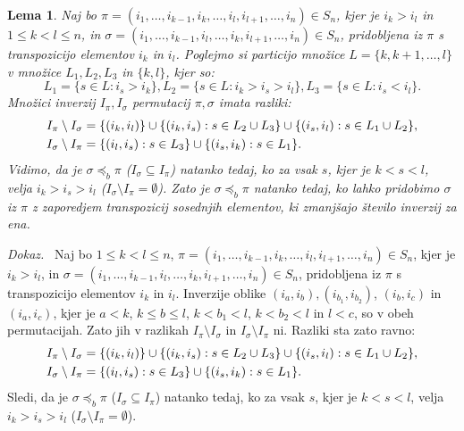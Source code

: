 \documentclass[a4paper, 12pt]{book}
\newtheorem{lema}{Lema}[chapter]
\newenvironment{dokaz}{\emph{Dokaz.}\ }{\hspace{\fill}{$\Box$}}
\begin{document}
\begin{lema}
    Naj bo $\pi = (i_1, \dots, i_{k-1}, i_k, \dots, i_l, i_{l+1}, \dots, i_n) \in S_n$, kjer je $i_k > i_l$ in $1 \leq k < l \leq n$, in $\sigma = (i_1, \dots, i_{k-1}, i_l, \dots, i_k, i_{l+1}, \dots, i_n) \in S_n$, pridobljena iz $\pi$ s transpozicijo elementov $i_k$ in $i_l$. Poglejmo si particijo množice $L = \{ k, k+ 1, \dots, l\}$ v množice $L_1, L_2, L_3$ in $\{ k, l \}$, kjer so:
    \[
        L_1 = \{ s \in L: i_s > i_k \}, L_2 = \{ s \in L: i_k > i_s > i_l \}, L_3 = \{ s \in L: i_s < i_l \}.
    \]
    Množici inverzij $I_{\pi}, I_{\sigma}$ permutacij $\pi, \sigma$ imata razliki:
    \begin{align}
        I_{\pi} \setminus I_{\sigma} &= \{ (i_k, i_l) \} \cup \{ (i_k, i_s): s \in L_2 \cup L_3 \} \cup \{ (i_s, i_l): s \in L_1 \cup L_2 \}, \notag \\
        I_{\sigma} \setminus I_{\pi} &= \{ (i_l, i_s): s \in L_3 \} \cup \{ (i_s, i_k): s \in L_1 \}. \notag
    \end{align}
    Vidimo, da je $\sigma \preceq_b \pi$ ($I_{\sigma} \subseteq I_{\pi}$) natanko tedaj, ko za vsak $s$, kjer je $k < s < l$, velja $i_k > i_s > i_l$ ($I_{\sigma} \setminus I_{\pi} = \emptyset$). Zato je $\sigma \preceq_b \pi$ natanko tedaj, ko lahko pridobimo $\sigma$ iz $\pi$ z zaporedjem transpozicij sosednjih elementov, ki zmanjšajo število inverzij za ena.
\end{lema}
\begin{dokaz}
    Naj bo $1 \leq k < l \leq n$, $\pi = (i_1, \dots, i_{k-1}, i_k, \dots, i_l, i_{l+1}, \dots, i_n) \in S_n$, kjer je $i_k > i_l$, in $\sigma = (i_1, \dots, i_{k-1}, i_l, \dots, i_k, i_{l+1}, \dots, i_n) \in S_n$, pridobljena iz $\pi$ s transpozicijo elementov $i_k$ in $i_l$. Inverzije oblike $(i_a, i_b), (i_{b_1}, i_{b_2})$,  $(i_b, i_c)$ in $(i_a, i_c)$, kjer je $a < k$, $k \leq b \leq l$, $k < b_1 < l$, $k < b_2 < l$ in $l < c$, so v obeh permutacijah. Zato jih v razlikah $I_{\pi} \setminus I_{\sigma}$ in $I_{\sigma} \setminus I_{\pi}$ ni. Razliki sta zato ravno:
    \begin{align}
        I_{\pi} \setminus I_{\sigma} &= \{ (i_k, i_l) \} \cup \{ (i_k, i_s): s \in L_2 \cup L_3 \} \cup \{ (i_s, i_l): s \in L_1 \cup L_2 \}, \notag \\
        I_{\sigma} \setminus I_{\pi} &= \{ (i_l, i_s): s \in L_3 \} \cup \{ (i_s, i_k): s \in L_1 \}. \notag
    \end{align}
    Sledi, da je $\sigma \preceq_b \pi$ ($I_{\sigma} \subseteq I_{\pi}$) natanko tedaj, ko za vsak $s$, kjer je $k < s < l$, velja $i_k > i_s > i_l$ ($I_{\sigma} \setminus I_{\pi} = \emptyset$).
\end{dokaz}
\end{document}
